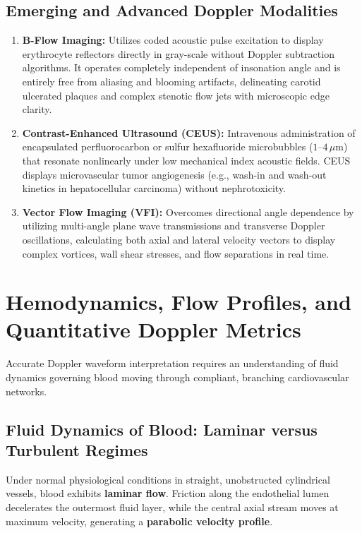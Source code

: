 \documentclass[11pt,a4paper]{article}
\begin{document}
\subsection{Emerging and Advanced Doppler Modalities}

\begin{enumerate}[leftmargin=*]
    \item \textbf{B-Flow Imaging:} Utilizes coded acoustic pulse excitation to display erythrocyte reflectors directly in gray-scale without Doppler subtraction algorithms. It operates completely independent of insonation angle and is entirely free from aliasing and blooming artifacts, delineating carotid ulcerated plaques and complex stenotic flow jets with microscopic edge clarity.
    \item \textbf{Contrast-Enhanced Ultrasound (CEUS):} Intravenous administration of encapsulated perfluorocarbon or sulfur hexafluoride microbubbles ($1\text{--}4\,\mu\text{m}$) that resonate nonlinearly under low mechanical index acoustic fields. CEUS displays microvascular tumor angiogenesis (e.g., wash-in and wash-out kinetics in hepatocellular carcinoma) without nephrotoxicity.
    \item \textbf{Vector Flow Imaging (VFI):} Overcomes directional angle dependence by utilizing multi-angle plane wave transmissions and transverse Doppler oscillations, calculating both axial and lateral velocity vectors to display complex vortices, wall shear stresses, and flow separations in real time.
\end{enumerate}

\section{Hemodynamics, Flow Profiles, and Quantitative Doppler Metrics}

Accurate Doppler waveform interpretation requires an understanding of fluid dynamics governing blood moving through compliant, branching cardiovascular networks.

\subsection{Fluid Dynamics of Blood: Laminar versus Turbulent Regimes}

Under normal physiological conditions in straight, unobstructed cylindrical vessels, blood exhibits \textbf{laminar flow}. Friction along the endothelial lumen decelerates the outermost fluid layer, while the central axial stream moves at maximum velocity, generating a \textbf{parabolic velocity profile}.
\end{document}
